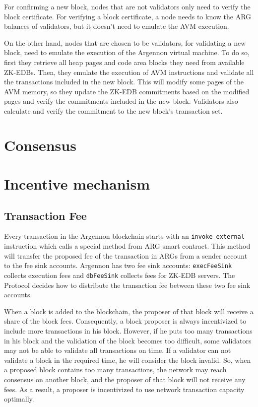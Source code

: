 For confirming a new block, nodes that are not validators only need to verify the block certificate. For
verifying a block certificate, a node needs to know the ARG balances of validators, but it doesn't need to
emulate the AVM execution.

On the other hand, nodes that are chosen to be validators, for validating a new block, need to emulate the
execution of the Argennon virtual machine. To do so, first they retrieve all heap pages and code area blocks they
need from available ZK-EDBs. Then, they emulate the execution of AVM instructions and validate all the
transactions included in the new block. This will modify some pages of the AVM memory, so they update the ZK-EDB
commitments based on the modified pages and verify the commitments included in the new block. Validators also
calculate and verify the commitment to the new block's transaction set.



\section{Consensus}\label{sec:consensus}


\section{Incentive mechanism}\label{sec:incentive-mechanism}

\subsection{Transaction Fee}\label{subsec:transaction-fee}

Every transaction in the Argennon blockchain starts with an \texttt{invoke\_external} instruction which calls a
special method from ARG smart contract. This method will transfer the proposed fee of the transaction in ARGs
from a sender account to the fee sink accounts. Argennon has two fee sink accounts: \texttt{execFeeSink} collects
execution fees and \texttt{dbFeeSink} collects fees for ZK-EDB servers. The Protocol decides how to distribute the
transaction fee between these two fee sink accounts.

When a block is added to the blockchain, the proposer of that block will receive a share of the block fees.
Consequently, a block proposer is always incentivized to include more transactions in his block. However, if he
puts too many transactions in his block and the validation of the block becomes too difficult, some validators
may not be able to validate all transactions on time. If a validator can not validate a block in the required
time, he will consider the block invalid. So, when a proposed block contains too many transactions, the network
may reach consensus on another block, and the proposer of that block will not receive any fees. As a result, a
proposer is incentivized to use network transaction capacity optimally.

